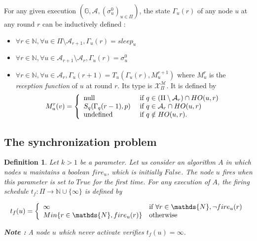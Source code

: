 \documentclass{article}
\newtheorem{definition}{Definition}
\newcommand{\tf}{t_{f}}
\begin{document}
For any given execution $(\mathds{G}, \mathcal{A}, (\sigma^0_u)_{u \in \Pi})$,
the state $\Gamma_u(r)$ of any node $u$ at any round $r$ can be inductively defined :

\begin{itemize}
	\item $\forall r \in \mathds{N}, \forall u \in \Pi \setminus \mathcal{A}_{r+1}, \Gamma_u(r) = sleep_u$
	\item $\forall r \in \mathds{N}, \forall u \in \mathcal{A}_{r+1} \setminus \mathcal{A}_r,
		\Gamma_u(r) = \sigma^0_u$
	\item $\forall r \in \mathds{N}, \forall u \in \mathcal{A}_r, \Gamma_u(r+1) = T_u(\Gamma_u(r), M_u^{r+1})$
		where $M_u^r$ is the \textit{reception function} of $u$ at round $r$.
		Its type is $\mathcal{X}_\Pi^{\mathcal{M}}$.
		It is defined by
			$$ M_u^r(v) = \left \{ \begin{array}{l l}
				\mbox{null}  & \mbox{ if  } q \in (\Pi \setminus \mathcal{A}_r  ) \cap  HO(u,r)  \\
				S_q (\Gamma_q(r-1), p)  & \mbox{ if  }   q \in \mathcal{A}_r  \cap  HO(u,r) \\
				\mbox{undefined} & \mbox{ if  }   q \notin  HO(u,r) .
				\end{array} \right.$$ 
\end{itemize}

\subsection{The synchronization problem}

\begin{definition}
	Let $k > 1$ be a parameter. Let us consider an algorithm $A$ in which nodes $u$ maintains a boolean $fire_u$, which is initially $False$.
	The node $u$ fires when this parameter is set to $True$ for the first time.
	For any execution of $A$, the firing schedule $\tf : \Pi \rightarrow \mathds{N} \cup \{\infty\}$ is defined by 

	$$\tf(u) = \left \{
	\begin{array}{l l}
		\infty & \mbox{if}~\forall r \in \mathds{N}, \neg fire_u(r) \\
		Min \{r \in \mathds{N}, fire_u(r)\} & \mbox{otherwise}
	\end{array} \right.$$

	\textbf{Note :} A node $u$ which never activate verifies $\tf(u) = \infty$.
\end{definition}
\end{document}
